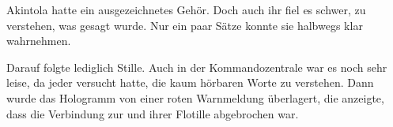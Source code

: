 \par

Akintola hatte ein ausgezeichnetes Gehör. Doch auch ihr fiel es schwer, zu verstehen, was gesagt wurde. Nur ein paar Sätze konnte sie halbwegs klar wahrnehmen. 

\par

Darauf folgte lediglich Stille. Auch in der Kommandozentrale war es noch sehr leise, da jeder versucht hatte, die kaum hörbaren Worte zu verstehen. Dann wurde das Hologramm von einer roten Warnmeldung überlagert, die anzeigte, dass die Verbindung zur  und ihrer Flotille abgebrochen war.
